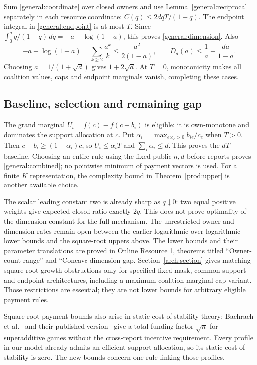 \documentclass[11pt]{article}
\theoremstyle{definition}\newtheorem{definition}[theorem]{Definition}
\theoremstyle{remark}\newtheorem{remark}[theorem]{Remark}
\begin{document}
Sum \eqref{general:coordinate} over closed owners and use
Lemma~\ref{general:reciprocal} separately in each resource coordinate:
$C(q)\le 2dqT/(1-q)$. The endpoint integral in
\eqref{general:endpoint} is at most $T$. Since
$\int_0^a q/(1-q)\,dq=-a-\log(1-a)$, this proves
\eqref{general:dimension}. Also
\[
 -a-\log(1-a)=\sum_{k\ge2}\frac{a^k}{k}
 \le\frac{a^2}{2(1-a)},\qquad
 D_d(a)\le\frac1a+\frac{da}{1-a}.
\]
Choosing $a=1/(1+\sqrt d)$ gives $1+2\sqrt d$.
At $T=0$, monotonicity makes all coalition values, caps and endpoint
marginals vanish, completing these cases.

\subsection{Baseline, selection and remaining gap}
The grand marginal $U_i=f(c)-f(c-b_i)$ is eligible: it is own-monotone and
dominates the support allocation at $c$. Put
$\alpha_i=\max_{e:c_e>0}b_{ie}/c_e$ when $T>0$.
Then $c-b_i\ge(1-\alpha_i)c$, so $U_i\le\alpha_iT$ and
$\sum_i\alpha_i\le d$. This proves the $dT$ baseline.
Choosing an entire rule using the fixed public $n,d$ before reports proves
\eqref{general:combined}; no pointwise minimum of payment vectors is used.
For a finite $K$ representation, the complexity bound in
Theorem~\ref{prod:upper} is another available choice.

The scalar leading constant two is already sharp as $q\downarrow0$:
two equal positive weights give expected closed ratio exactly $2q$.
This does not prove optimality of the dimension constant for the full mechanism.
The unrestricted owner and dimension rates remain open between the earlier
logarithmic-over-logarithmic lower bounds and the square-root uppers above.
The lower bounds and their parameter translations are proved in Online
Resource 1, theorems titled ``Owner-count range'' and ``Concave dimension gap.
Section~\ref{arch:section} gives matching square-root growth obstructions only for
specified fixed-mask, common-support and endpoint architectures, including
a maximum-coalition-marginal cap variant. Those restrictions are essential;
they are not lower bounds for arbitrary eligible payment rules.

Square-root payment bounds also arise in static cost-of-stability theory:
Bachrach et al.~\cite[Theorem 3.5]{Bachrach2009} and their published
version~\cite[Theorem 7]{Bachrach} give a total-funding factor $\sqrt n$ for
superadditive games without the cross-report incentive requirement. Every profile in our
model already admits an efficient support allocation, so its static cost of
stability is zero. The new bounds concern one rule linking those profiles.
\end{document}

